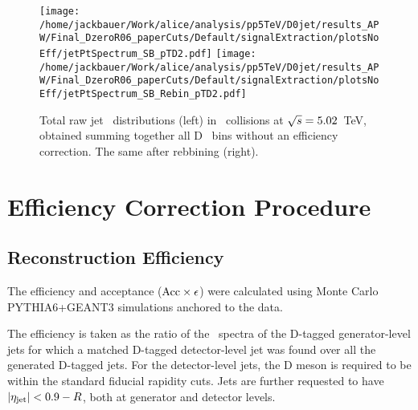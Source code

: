 \begin{figure}[bth]
\centering
	\texttt{[image: /home/jackbauer/Work/alice/analysis/pp5TeV/D0jet/results\_APW/Final\_DzeroR06\_paperCuts/Default/signalExtraction/plotsNoEff/jetPtSpectrum\_SB\_pTD2.pdf]}
	\texttt{[image: /home/jackbauer/Work/alice/analysis/pp5TeV/D0jet/results\_APW/Final\_DzeroR06\_paperCuts/Default/signalExtraction/plotsNoEff/jetPtSpectrum\_SB\_Rebin\_pTD2.pdf]}
\caption{Total raw jet \pt\ distributions (left) in \pp\ collisions at $\sqrt{s}=5.02$~TeV, obtained summing together all D \pt\ bins without an efficiency correction. The same after rebbining (right).}
\label{fig:eq_pp_signBkgJet_totR06}
\end{figure}




\section{Efficiency Correction Procedure}
\label{sect:DmesonRecEff}
\subsection*{Reconstruction Efficiency}

The efficiency and acceptance (${\rm Acc} \times \epsilon$) were calculated using Monte Carlo PYTHIA6+GEANT3 simulations anchored to the data.

The efficiency is taken as the ratio of the \ptd\ spectra of the D-tagged generator-level jets for which a matched
D-tagged detector-level jet was found over all the generated D-tagged jets.
For the detector-level jets, the D meson is required to be within the standard fiducial rapidity cuts.
Jets are further requested to have $|\eta_{\rm jet}| < 0.9 - R$, both at generator and detector levels.




